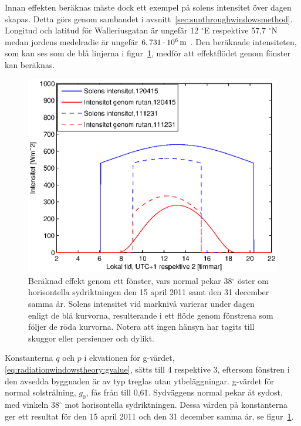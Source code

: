 Innan effekten beräknas måste dock ett exempel på solens intensitet över dagen skapas. Detta görs genom sambandet i avsnitt~\ref{sec:sunthroughwindowsmethod}. Longitud och latitud för Walleriusgatan är ungefär 12 $^\circ$E respektive 57,7 $^\circ$N medan jordens medelradie är ungefär $\unit[6,731\cdot 10^{6}]{m}$ \cite{physicshandbook}. Den beräknade intensiteten, som kan ses som de blå linjerna i figur~\ref{fig:effekt0415and1231}, medför att effektflödet genom fönster kan beräknas.

\begin{figure}[hpbt]
\centering
\includegraphics[scale=0.7]{images/effekt0415and1231.eps}
\caption{\label{fig:effekt0415and1231} Beräknad effekt genom ett fönster, vars normal pekar 38$^{\circ}$ öster om horisontella sydriktningen den 15 april 2011 samt den 31 december samma år. Solens intensitet vid marknivå varierar under dagen enligt de blå kurvorna, resulterande i ett flöde genom fönstrena som följer de röda kurvorna. Notera att ingen hänsyn har tagits till skuggor eller persienner och dylikt.}
\end{figure}

Konstanterna $q$ och $p$ i ekvationen för g-värdet, \ref{eq:radiationwindowstheory:gvalue}, sätts till 4 respektive 3, eftersom fönstren i den avsedda byggnaden är av typ treglas utan ytbeläggningar. g-värdet för normal solstrålning, $g_0$, fås från \cite{ASHRAE09} till 0,61. Sydväggens normal pekar åt sydost, med vinkeln 38$^{\circ}$ mot horisontella sydriktningen. Dessa värden på konstanterna ger ett resultat  för den 15 april 2011 och den 31 december samma år, se figur~\ref{fig:effekt0415and1231}.


